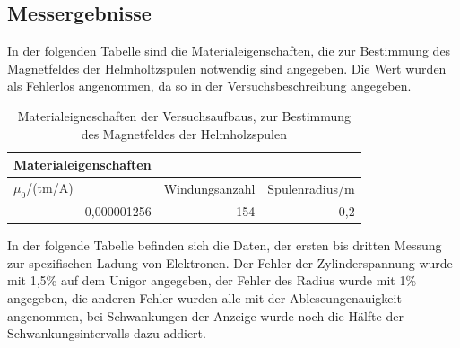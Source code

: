 \documentclass[12pt,a4paper]{article}
\begin{document}
\subsection{Messergebnisse}

In der folgenden Tabelle sind die Materialeigenschaften, die zur Bestimmung des Magnetfeldes der Helmholtzspulen notwendig sind angegeben. Die Wert wurden als Fehlerlos angenommen, da so in der Versuchsbeschreibung angegeben.

\begin{table}[htbp]
\caption{Materialeigneschaften der Versuchsaufbaus, zur Bestimmung des Magnetfeldes der Helmholzspulen}
\begin{center}
\begin{tabular}{|l|l|l|}
\hline
Materialeigenschaften &  &  \\ \hline
$\mu_0$/(tm/A) & Windungsanzahl & Spulenradius/m \\ \hline
\multicolumn{1}{|r|}{0,000001256} & \multicolumn{1}{r|}{154} & \multicolumn{1}{r|}{0,2} \\ \hline
\end{tabular}
\end{center}
\label{tab:1_m}
\end{table}



In der folgende Tabelle befinden sich die Daten, der ersten bis dritten Messung zur spezifischen Ladung von Elektronen. Der Fehler der Zylinderspannung wurde mit 1,5\% auf dem Unigor angegeben, der Fehler des Radius wurde mit 1\% angegeben, die anderen Fehler wurden alle mit der Ableseungenauigkeit angenommen, bei Schwankungen der Anzeige wurde noch die Hälfte der Schwankungsintervalls dazu addiert.
\end{document}
